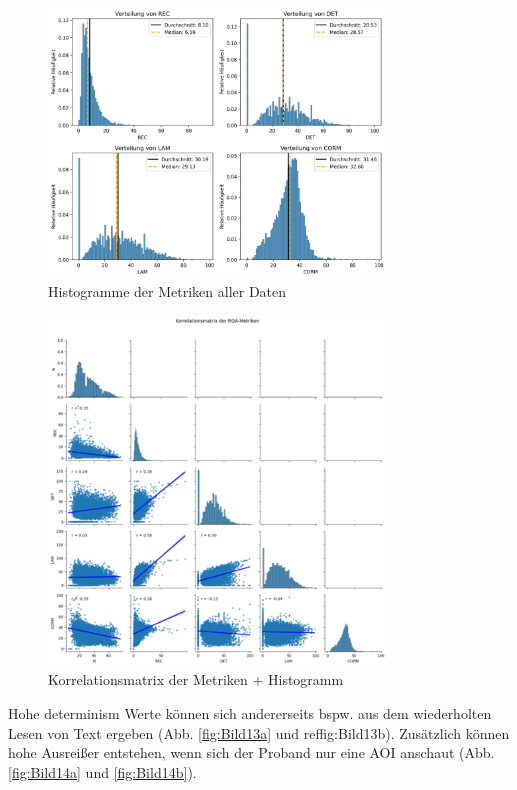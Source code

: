\documentclass[
    language=german, %
    thesis=seminar, %
    supervisor=postdoc, %
    multiauthor=true, %
    ]{settings/csssa-thesis}
\begin{document}
\begin{figure}[ht]
    \centering
    \includegraphics[width=0.8\textwidth,height=0.8\textheight,keepaspectratio]{figures/Bild12.png}
    \caption{Histogramme der Metriken aller Daten}\label{fig:Bild11}
\end{figure}

\begin{figure}[ht]
    \centering
    \includegraphics[width=0.8\textwidth,height=0.8\textheight,keepaspectratio]{figures/Bild13.png}
    \caption{Korrelationsmatrix der Metriken + Histogramm}\label{fig:Bild12}
\end{figure}

Hohe determinism Werte können sich andererseits bspw. 
aus dem wiederholten Lesen von Text ergeben (Abb. \ref{fig:Bild13a} und ref{fig:Bild13b}). 
Zusätzlich können hohe Ausreißer entstehen, wenn sich der Proband nur eine AOI anschaut (Abb. \ref{fig:Bild14a} und \ref{fig:Bild14b}). 
\end{document}
